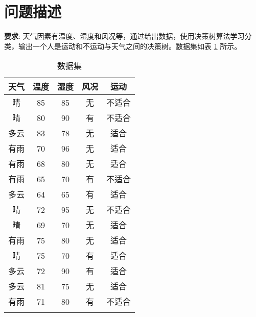 \documentclass[12pt,AutoFakeBold]{article}
\begin{document}
\maketitle
\setcounter{tocdepth}{2}

\tableofcontents  %

\makeatletter
\begin{center}
    \LARGE \textbf{\textsf{\@problem}}
\end{center}
\makeatother


\section{问题描述}

\textbf{要求}: 天气因素有温度、湿度和风况等，通过给出数据，使用决策树算法学习分类，输出一个人是运动和不运动与天气之间的决策树。数据集如表 \ref{tab:dataset} 所示。

\begin{table}[htbp]
\setlength{\abovecaptionskip}{0cm} 
\setlength{\belowcaptionskip}{-0.2cm}
\begin{center}
\caption{数据集} \label{tab:dataset}
\begin{tabular}{|c|c|c|c|c|}
\Xhline{4\arrayrulewidth}
\textbf{天气} & \textbf{温度} & \textbf{湿度} & \textbf{风况} & \textbf{运动}  \\ \hline
晴  & 85 & 85 & 无  & 不适合 \\ \hline
晴  & 80 & 90 & 有  & 不适合 \\ \hline
多云 & 83 & 78 & 无  & 适合  \\ \hline
有雨 & 70 & 96 & 无  & 适合  \\ \hline
有雨 & 68 & 80 & 无  & 适合  \\ \hline
有雨 & 65 & 70 & 有  & 不适合 \\ \hline
多云 & 64 & 65 & 有  & 适合  \\ \hline
晴  & 72 & 95 & 无  & 不适合 \\ \hline
晴  & 69 & 70 & 无  & 适合  \\ \hline
有雨 & 75 & 80 & 无  & 适合  \\ \hline
晴  & 75 & 70 & 有  & 适合  \\ \hline
多云 & 72 & 90 & 有  & 适合  \\ \hline
多云 & 81 & 75 & 无  & 适合  \\ \hline
有雨 & 71 & 80 & 有  & 不适合 \\ \Xhline{4\arrayrulewidth}
\end{tabular}
\end{center}
\end{table}
\end{document}
